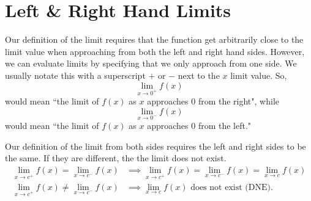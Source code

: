 \section{Left \& Right Hand Limits}
Our definition of the limit requires that the function get arbitrarily close to the limit value when approaching from both the left and right hand sides.
However, we can evaluate limits by specifying that we only approach from one side.
We usually notate this with a superscript $+$ or $-$ next to the $x$ limit value.
So,
\begin{equation*}
	\lim_{x \to 0^+}{f(x)}
\end{equation*}
would mean ``the limit of $f(x)$ as $x$ approaches $0$ from the right", while
\begin{equation*}
	\lim_{x \to 0^-}{f(x)}
\end{equation*}
would mean ``the limit of $f(x)$ as $x$ approaches $0$ from the left."

\noindent
Our definition of the limit from both sides requires the left and right sides to be the same.
If they are different, the the limit does not exist.
\begin{align*}
	\lim_{x \to c^+}{f(x)} = \lim_{x \to c^-}{f(x)} &\implies \lim_{x \to c^+}{f(x)} = \lim_{x \to c^-}{f(x)} = \lim_{x \to c}{f(x)} \\
	\lim_{x \to c^+}{f(x)} \neq \lim_{x \to c^-}{f(x)} &\implies \lim_{x \to c}{f(x)} \text{ does not exist (DNE)}.
\end{align*}